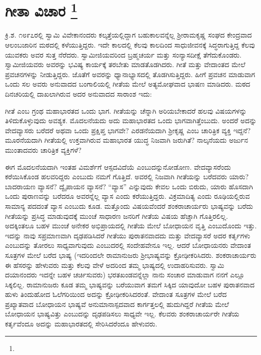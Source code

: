 
\chapter[ಗೀತಾ ವಿಚಾರ ]{ಗೀತಾ ವಿಚಾರ \protect\footnote{}}

ಕ್ರಿ.ಶ. ೧೮೯೭ರಲ್ಲಿ ಸ್ವಾಮಿ ವಿವೇಕಾನಂದರು ಕಲ್ಕತ್ತೆಯಲ್ಲಿದ್ದಾಗ ಬಹುಕಾಲವನ್ನೆಲ್ಲ ಶ‍್ರೀರಾಮಕೃಷ್ಣ ಸಂಘದ ಕೇಂದ್ರವಾದ ಆಲಂಬಜಾರಿನ ಮಠದಲ್ಲಿ ಕಳೆಯುತ್ತಿದ್ದರು. ಇದೇ ಕಾಲದಲ್ಲಿ ಕೆಲವು ಕಾಲದಿಂದ ಸಾಧುಜೀವನಕ್ಕೆ ಸಿದ್ಧರಾಗುತ್ತಿದ್ದ ಕೆಲವು ಯುವಕರು ಅವರ ಸುತ್ತ ನೆರೆದರು. ಸ್ವಾಮೀಜಿಯವರಿಂದ ಬ್ರಹ್ಮಚರ್ಯ ಮತ್ತು ಸಂನ್ಯಾಸದೀಕ್ಷೆ ತೆಗೆದುಕೊಂಡರು. ಸ್ವಾಮೀಜಿಯವರು ಅವರನ್ನು ಭವಿಷ್ಯ ಕಾರ್ಯಕ್ಕೆ ತರಬೇತು ಮಾಡತೊಡಗಿದರು. ಗೀತೆ ಮತ್ತು ವೇದಾಂತದ ಮೇಲೆ ಪ್ರವಚನಗಳನ್ನು ನೀಡುತ್ತಿದ್ದರು. ಜೊತೆಗೆ ಅವರನ್ನು ಧ್ಯಾನಾಭ್ಯಾಸದಲ್ಲಿ ತೊಡಗಿಸುತ್ತಿದ್ದರು. ಹೀಗೆ ಪ್ರವಚನ ಮಾಡುವಾಗ ಒಂದು ಸಲ ಅವರು ಅನುವಾದದ ಬಂಗಾಲಿಯಲ್ಲಿ ಗೀತೆಯ ಮೇಲೆ ಅತ್ಯಮೋಘವಾದ ಭಾಷಣ ಮಾಡಿದರು. ಮಠದ ದಿನಚರಿಯಲ್ಲಿ ದಾಖಲಾಗಿರುವ ಅದರ ಅನುವಾದದ ಸಾರಾಂಶ ಇದು:

ಗೀತೆ ಎಂಬ ಗ್ರಂಥ ಮಹಾಭಾರತದ ಒಂದು ಭಾಗ. ಗೀತೆಯನ್ನು ಚೆನ್ನಾಗಿ ಅರಿಯಬೇಕಾದರೆ ಹಲವು ವಿಷಯಗಳನ್ನು ತಿಳಿದುಕೊಳ್ಳುವುದು ಅವಶ್ಯಕ. ಮೊದಲನೆಯದು ಅದು ಮಹಾಭಾರತದ ಒಂದು ಭಾಗವಾಗಿತ್ತೆಂಬುದು. ಅಂದರೆ ಅದನ್ನು ವೇದವ್ಯಾಸರು ಬರೆದರೆ ಅಥವಾ ಒಂದು ಪ್ರಕ್ಷಿಪ್ತ ಭಾಗವೇ? ಎರಡನೆಯದಾಗಿ ಶ‍್ರೀಕೃಷ್ಣ ಎಂಬ ಚಾರಿತ್ರಿಕ ವ್ಯಕ್ತಿ ಇದ್ದನೆ? ಮೂರನೆಯದಾಗಿ ಗೀತೆಯಲ್ಲಿ ಉಕ್ತವಾಗಿರುವ ಮಹಾಭಾರತ ಯುದ್ಧ ನಿಜವಾಗಿ ಜರುಗಿತೆ? ನಾಲ್ಕನೆಯದು ಅರ್ಜುನ ಮುಂತಾದವರು ಚಾರಿತ್ರಿಕ ವ್ಯಕ್ತಿಗಳೆ?

ಈಗ ಮೊದಲನೆಯದಾಗಿ ಇಂತಹ ವಿಮರ್ಶೆಗೆ ಆಸ್ಪದವಿದೆಯೆ ಎಂಬುದನ್ನು\break ನೋಡೋಣ. ವೇದವ್ಯಾಸರೆಂದು ಕರೆಯಿಸಿಕೊಂಡ ಹಲವರಿದ್ದರು ಎಂಬುದು ನಮಗೆ ಗೊತ್ತಿದೆ. ಅವರಲ್ಲಿ ನಿಜವಾಗಿ ಗೀತೆಯನ್ನು ಬರೆದವರು ಯಾರು? ಬಾದರಾಯಣ ವ್ಯಾಸನೆ? ದ್ವೈಪಾಯನ ವ್ಯಾಸನೆ? “ವ್ಯಾಸ” ಎನ್ನುವುದು ಕೇವಲ ಒಂದು ಬಿರುದು, ಯಾರು ಹೊಸದಾಗಿ ಒಂದು ಪುರಾಣವನ್ನು ಬರೆದರೂ ಅವರನ್ನೆಲ್ಲ ವ್ಯಾಸ ಎಂದು ಕರೆಯು\-ತ್ತಿದ್ದರು. ವಿಕ್ರಮಾದಿತ್ಯ ಎಂದು ರೂಢಿಯಲ್ಲಿರುವ ಸಾಮಾನ್ಯ ಪದದಂತೆ ವ್ಯಾಸ ಎಂಬುದು ಕೂಡ. ಮತ್ತೊಂದು ವಿಷಯವೆಂದರೆ ಶಂಕರಾಚಾರ್ಯರು ಭಾಷ್ಯವನ್ನು ಬರೆದು ಗೀತೆಯನ್ನು ಪ್ರಸಿದ್ಧ ಮಾಡುವುದಕ್ಕೆ ಮುಂಚೆ ಸಾಧಾರಣ ಜನರಿಗೆ ಗೀತೆಯ ವಿಷಯ ಹೆಚ್ಚಾಗಿ ಗೊತ್ತಿರಲಿಲ್ಲ. ಅದಕ್ಕಿಂತಲೂ ಬಹಳ ಮುಂಚೆ ಅನೇಕರ ಅಭಿಪ್ರಾಯದಲ್ಲಿ ಗೀತೆಯ ಮೇಲೆ ಬೋಧಾಯನ ವೃತ್ತಿ ಎಂಬುದೊಂದು ಇತ್ತು. ಇದನ್ನು ನಾವು ಸಪ್ರಮಾಣವಾಗಿ ದೃಢಪಡಿಸಿದರೆ ಗೀತೆಯು ಪುರಾತನವಾದದು ಮತ್ತು ವೇದವ್ಯಾಸರೆ ಅದರ ಕರ್ತೃಗಳು ಎಂಬುದನ್ನು ತೋರಲು ಸಾಧ್ಯವಾಗುವುದು ಎಂಬುದರಲ್ಲಿ ಸಂದೇಹವೇನೂ ಇಲ್ಲ. ಆದರೆ ಬೋಧಾಯನರು ವೇದಾಂತ ಸೂತ್ರಗಳ ಮೇಲೆ ಬರೆದ ಭಾಷ್ಯ (ಇದರಿಂದಲೇ ರಾಮಾನುಜರು ಶ‍್ರೀಭಾಷ್ಯವನ್ನು ಕ್ರೋಢೀಕರಿಸಿದರು. ಶಂಕರಾಚಾರ್ಯರು ಈ ಹೆಸರನ್ನು ಹೇಳುವರು ಮತ್ತು ಕೆಲವು ವೇಳೆ ಅದರಿಂದ ತಮ್ಮ ಭಾಷ್ಯದಲ್ಲಿ ಉದಾಹರಿಸುವರು. ಸ್ವಾಮಿ ದಯಾನಂದರು ಇದನ್ನೇ ಬಹಳ ಚರ್ಚಿಸುವರು) ಭರತಖಂಡವನ್ನೆಲ್ಲಾ ನಾನು ಸಂಚಾರ ಮಾಡುವಾಗ ನನಗೆ ಎಲ್ಲೂ ಸಿಕ್ಕಲಿಲ್ಲ. ರಾಮಾನುಜರು ಕೂಡ ತಮ್ಮ ಭಾಷ್ಯವನ್ನು ಬರೆಯುವಾಗ ತಮಗೆ ಸಿಕ್ಕಿದ ಯಾವುದೋ ಬಹಳ ಪುರಾತನವಾದ ಹುಳು ತಿಂದುಹೋದ ಓಲೆಗರಿಯಿಂದ ಅದನ್ನು ಕ್ರೋಢೀಕರಿಸಿದರಂತೆ. ವೇದಾಂತ ಸೂತ್ರಗಳ ಮೇಲೆ ಬರೆದ ಪ್ರಖ್ಯಾತವಾದ ಬೋಧಾಯನ ಭಾಷ್ಯವೆ ಅನುಮಾನಾಸ್ಪದವಾದ ಕಾರ್ಗತ್ತಲಲ್ಲಿ ಹುದುಗಿದ್ದರೆ ಗೀತೆಯ ಮೇಲೆ ಬೋಧಾಯನ ಭಾಷ್ಯವಿತ್ತು ಎಂಬುದನ್ನು ದೃಢಪಡಿಸಲು ಸಾಧ್ಯವೇ ಇಲ್ಲ. ಕೆಲವರು ಶಂಕರಾಚಾರ್ಯರೇ ಗೀತೆಯ ಕರ್ತೃವೆಂದೂ ಅದನ್ನು ಮಹಾಭಾರತದಲ್ಲಿ ಸೇರಿಸಿದರೆಂದೂ ಹೇಳುವರು.


